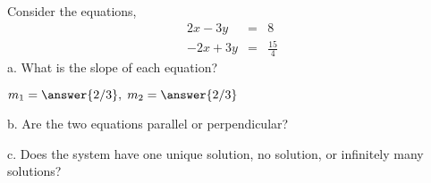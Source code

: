\documentclass{ximera}
\author{Parisa Fatheddin}
\begin{document}
\begin{exercise}


Consider the equations,
\begin{eqnarray*}
2x-3y &=& 8\\
-2x +3y &=& \frac{15}{4}
\end{eqnarray*}
a. What is the slope of each equation? \\

\begin{prompt}
$m_{1} = \answer{2/3}, \hspace{.1cm} m_{2} = \answer{2/3}$
\end{prompt}

b. Are the two equations parallel or perpendicular? \\

\begin{prompt}
\begin{multipleChoice}
\end{multipleChoice}
\end{prompt}

c. Does the system have one unique solution, no solution, or infinitely many solutions?

\begin{prompt}
\begin{multipleChoice}
\end{multipleChoice}
\end{prompt}
























\end{exercise}
\end{document}
